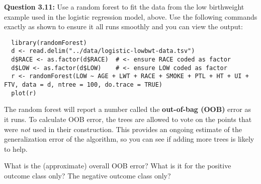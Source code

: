 \begin{mdframed}
\textbf{Question 3.11:} Use a random forest to fit the data from the low birthweight example used in the logistic regression model, above. Use the following commands exactly as shown to ensure it all runs smoothly and you can view the output:
\begin{center}
\begin{lstlisting}
  library(randomForest)
  d <- read.delim("../data/logistic-lowbwt-data.tsv")
  d$RACE <- as.factor(d$RACE)  # <- ensure RACE coded as factor
  d$LOW <- as.factor(d$LOW)    # <- ensure LOW coded as factor
  r <- randomForest(LOW ~ AGE + LWT + RACE + SMOKE + PTL + HT + UI + FTV, data = d, ntree = 100, do.trace = TRUE)
  plot(r)
\end{lstlisting}
\end{center}
The random forest will report a number called the \textbf{out-of-bag (OOB)} error as it runs. To calculate OOB error, the trees are allowed to vote on the points that were \emph{not} used in their construction. This provides an ongoing estimate of the generalization error of the algorithm, so you can see if adding more trees is likely to help.

What is the (approximate) overall OOB error? What is it for the positive outcome class only? The negative outcome class only?
\end{mdframed}
